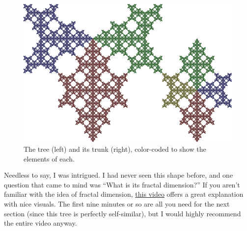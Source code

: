 \documentclass{article}
\begin{document}
\begin{figure}[H]
  \centering
  \includegraphics[scale=0.125]{tree_colored.png}
  \caption*{The tree (left) and its trunk (right),
  color-coded to show the elements of each.}
\end{figure}
Needless to say, I was intrigued.
I had never seen this shape before,
and one question that came to mind was
``What is its fractal dimension?''
If you aren't familiar with the idea of fractal dimension,
\href{https://www.youtube.com/watch?v=gB9n2gHsHN4}{this video}
offers a great explanation with nice visuals.
The first nine minutes or so are all you need for the next section
(since this tree is perfectly self-similar),
but I would highly recommend the entire video anyway.
\end{document}
